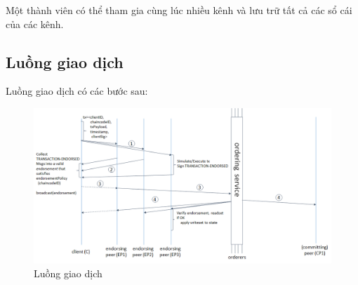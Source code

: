 Một thành viên có thể tham gia cùng lúc nhiều kênh và lưu trữ tất cả các sổ cái của các kênh.







\subsection{Luồng giao dịch}

Luồng giao dịch có các bước sau:
\begin{figure}[h]
    \centering
    \includegraphics[width=1\textwidth]{images/flow-4.png}
    \caption{Luồng giao dịch }
\end{figure}


